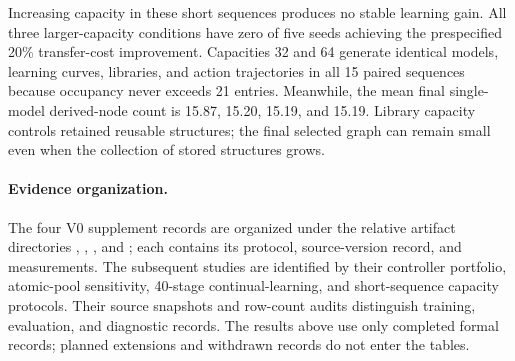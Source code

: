 Increasing capacity in these short sequences produces no stable learning gain.
All three larger-capacity conditions have zero of five seeds achieving the
prespecified 20\% transfer-cost improvement. Capacities 32 and 64 generate
identical models, learning curves, libraries, and action trajectories in all
15 paired sequences because occupancy never exceeds 21 entries. Meanwhile,
the mean final single-model derived-node count is 15.87, 15.20, 15.19, and 15.19.
Library capacity controls retained reusable structures; the final selected
graph can remain small even when the collection of stored structures grows.

\paragraph{Evidence organization.}
The four V0 supplement records are organized under the relative artifact
directories ,
, , and ; each contains
its protocol, source-version record, and measurements. The subsequent studies
are identified by their controller portfolio, atomic-pool sensitivity,
40-stage continual-learning, and short-sequence capacity protocols. Their
source snapshots and row-count audits distinguish training, evaluation, and
diagnostic records. The results above use only completed formal records;
planned extensions and withdrawn records do not enter the tables.
